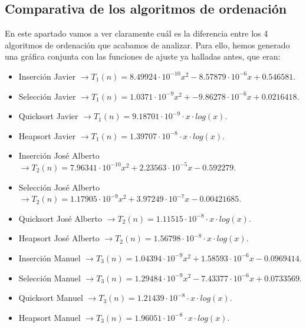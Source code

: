 \documentclass[10pt,a4paper]{article}
\begin{document}
\subsection{Comparativa de los algoritmos de ordenación}

En este apartado vamos a ver claramente cuál es la diferencia entre los 4 algoritmos de ordenación que acabamos de analizar. Para ello, hemos generado una gráfica conjunta con las funciones de ajuste ya halladas antes, que eran:

\begin{itemize}
	\item Inserción Javier \(\rightarrow T_1(n) = 8.49924 \cdot 10^{-10} x^2 - 8.57879 \cdot 10^{-6} x + 0.546581\).
	\item Selección Javier \(\rightarrow T_1(n) = 1.0371 \cdot 10^{-9} x^2 + -9.86278 \cdot 10^{-6} x +0.0216418\).
	\item Quicksort Javier \(\rightarrow T_1(n) = 9.18701 \cdot 10^{-9} \cdot x \cdot log(x)\).
	\item Heapsort Javier \(\rightarrow T_1(n) = 1.39707 \cdot 10^{-8} \cdot x \cdot log(x)\).
\end{itemize}

\begin{itemize}
	\item Inserción José Alberto \(\rightarrow T_2(n) = 7.96341 \cdot 10^{-10} x^2 + 2.23563 \cdot 10^{-5} x - 0.592279\).
	\item Selección José Alberto \(\rightarrow T_2(n) = 1.17905 \cdot 10^{-9} x^2 + 3.97249 \cdot 10^{-7} x - 0.00421685\).
	\item Quicksort José Alberto \(\rightarrow T_2(n) = 1.11515 \cdot 10^{-8} \cdot x \cdot log(x)\).
	\item Heapsort José Alberto \(\rightarrow T_2(n) = 1.56798 \cdot 10^{-8} \cdot x \cdot log(x)\).
\end{itemize}

\begin{itemize}
	\item Inserción Manuel \(\rightarrow T_3(n) = 1.04394 \cdot 10^{-9} x^2 + 1.58593 \cdot 10^{-6} x - 0.0969414\).
	\item Selección Manuel \(\rightarrow T_3(n) = 1.29484 \cdot 10^{-9} x^2 - 7.43377 \cdot 10^{-6} x + 0.0733569\).
	\item Quicksort Manuel \(\rightarrow T_3(n) = 1.21439 \cdot 10^{-8} \cdot x \cdot log(x)\).
	\item Heapsort Manuel \(\rightarrow T_3(n) = 1.96051 \cdot 10^{-8} \cdot x \cdot log(x)\).
\end{itemize}
\end{document}
